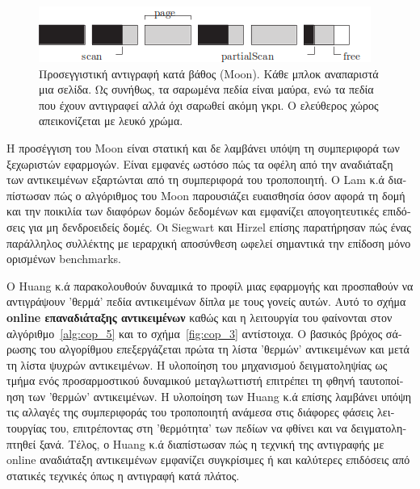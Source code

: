 \begin{greek}
\begin{figure}[H]
  \centering
  \includegraphics{figures/cop_4}
  \caption[Προσεγγιστική αντιγραφή κατά βάθος (Moon).]
   {Προσεγγιστική αντιγραφή κατά βάθος (Moon). Κάθε μπλοκ αναπαριστά
    μια σελίδα. Ως συνήθως, τα σαρωμένα πεδία είναι μαύρα, ενώ
    τα πεδία που έχουν αντιγραφεί αλλά όχι σαρωθεί ακόμη γκρι.
    Ο ελεύθερος χώρος απεικονίζεται με λευκό χρώμα.}
  \label{fig:cop_4}
\end{figure}

Η προσέγγιση του Moon είναι στατική και δε λαμβάνει υπόψη τη
συμπεριφορά των ξεχωριστών εφαρμογών. Είναι εμφανές ωστόσο πώς
τα οφέλη από την αναδιάταξη των αντικειμένων εξαρτώνται από τη
συμπεριφορά του τροποποιητή. Ο Lam κ.ά \cite{DBLP:conf/iwmm/LamWM92}
διαπίστωσαν πώς ο αλγόριθμος του Moon παρουσιάζει ευαισθησία
όσον αφορά τη δομή και την ποικιλία των διαφόρων δομών δεδομένων
και εμφανίζει απογοητευτικές επιδόσεις για μη δενδροειδείς
δομές. Οι Siegwart και Hirzel \cite{DBLP:conf/iwmm/SiegwartH06}
επίσης παρατήρησαν πώς ένας παράλληλος συλλέκτης με ιεραρχική
αποσύνθεση ωφελεί σημαντικά την επίδοση μόνο ορισμένων benchmarks.

O Huang κ.ά \cite{DBLP:conf/oopsla/HuangBMMWC04} παρακολουθούν
δυναμικά το προφίλ μιας εφαρμογής και προσπαθούν να αντιγράψουν
'θερμά' πεδία αντικειμένων δίπλα με τους γονείς αυτών. Αυτό το
σχήμα \textbf{online επαναδιάταξης αντικειμένων} καθώς και η
λειτουργία του φαίνονται στον αλγόριθμο~\ref{alg:cop_5} και το
σχήμα~\ref{fig:cop_3} αντίστοιχα. Ο βασικός βρόχος σάρωσης του
αλγορίθμου επεξεργάζεται πρώτα τη λίστα 'θερμών' αντικειμένων
και μετά τη λίστα ψυχρών αντικειμένων. Η υλοποίηση του μηχανισμού
δειγματοληψίας ως τμήμα ενός προσαρμοστικού δυναμικού μεταγλωττιστή
επιτρέπει τη φθηνή ταυτοποίηση των 'θερμών' αντικειμένων. Η υλοποίηση
των Huang κ.ά επίσης λαμβάνει υπόψη τις αλλαγές της συμπεριφοράς
του τροποποιητή ανάμεσα στις διάφορες φάσεις λειτουργίας του,
επιτρέποντας στη 'θερμότητα' των πεδίων να φθίνει και να δειγματοληπτηθεί
ξανά. Τέλος, ο Huang κ.ά διαπίστωσαν πώς η τεχνική της αντιγραφής
με online αναδιάταξη αντικειμένων εμφανίζει συγκρίσιμες ή και
καλύτερες επιδόσεις από στατικές τεχνικές όπως η αντιγραφή κατά
πλάτος.


\end{greek}
